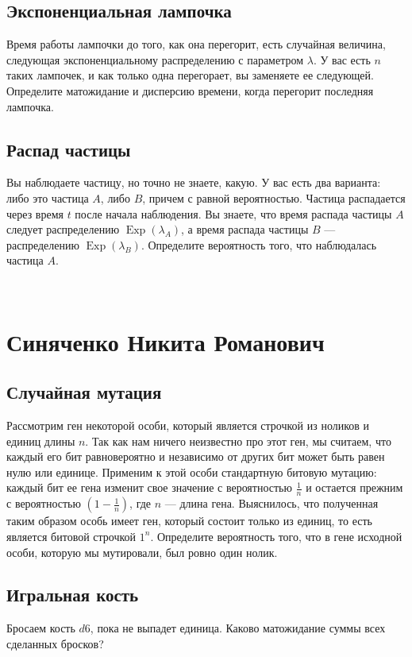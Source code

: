 \documentclass[12pt]{article}
\DeclareMathOperator{\Exp}{Exp}
\begin{document}
\subsection{Экспоненциальная лампочка}
Время работы лампочки до того, как она перегорит, есть случайная величина, следующая экспоненциальному распределению с параметром $\lambda$. У вас есть $n$ таких лампочек, и как только одна перегорает, вы заменяете ее следующей. Определите матожидание и дисперсию времени, когда перегорит последняя лампочка.

\subsection{Распад частицы}
Вы наблюдаете частицу, но точно не знаете, какую. У вас есть два варианта: либо это частица $A$, либо $B$, причем с равной вероятностью. Частица распадается через время $t$ после начала наблюдения. Вы знаете, что время распада частицы $A$ следует распределению $\Exp(\lambda_A)$, а время распада частицы $B$ --- распределению $\Exp(\lambda_B)$. Определите вероятность того, что наблюдалась частица $A$.

\newpage
~
\newpage
\section{Синяченко Никита Романович}

\subsection{Случайная мутация}
Рассмотрим ген некоторой особи, который является строчкой из ноликов и единиц длины $n$. Так как нам ничего неизвестно про этот ген, мы считаем, что каждый его бит равновероятно и независимо от других бит может быть равен нулю или единице. Применим к этой особи стандартную битовую мутацию: каждый бит ее гена изменит свое значение с вероятностью $\frac{1}{n}$ и остается прежним с вероятностью $(1 - \frac{1}{n})$, где $n$ --- длина гена. Выяснилось, что полученная таким образом особь имеет ген, который состоит только из единиц, то есть является битовой строчкой $1^n$. Определите вероятность того, что в гене исходной особи, которую мы мутировали, был ровно один нолик.

\subsection{Игральная кость}Бросаем кость $d6$, пока не выпадет единица. Каково матожидание суммы всех сделанных бросков?
\end{document}
